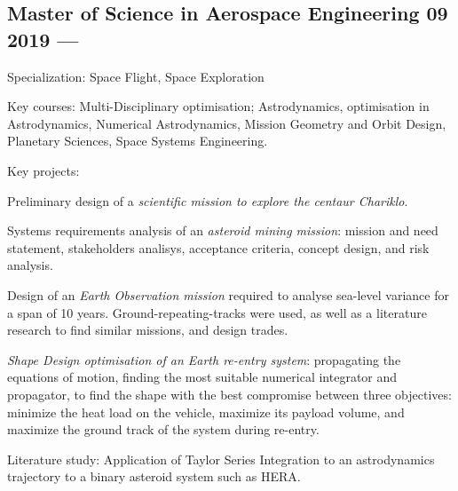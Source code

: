 


\subsection{{Master of Science in Aerospace Engineering} \hfill 09 2019 --- }
\begin{zitemize}
\item Specialization: Space Flight, Space Exploration
\item Key courses: Multi-Disciplinary optimisation; Astrodynamics, optimisation in Astrodynamics, Numerical Astrodynamics, Mission Geometry and Orbit Design, Planetary Sciences, Space Systems Engineering. 
\item Key projects: \begin{zitemize}
\item Preliminary design of a \textit{scientific mission to explore the centaur Chariklo}.
\item Systems requirements analysis of an \textit{asteroid mining mission}: mission and need statement, stakeholders analisys, acceptance criteria, concept design, and risk analysis.
\item Design of an \textit{Earth Observation mission} required to analyse sea-level variance for a span of 10 years. Ground-repeating-tracks were used, as well as a literature research to find similar missions, and design trades.
\item \textit{Shape Design optimisation of an Earth re-entry system}: propagating the equations of motion, finding the most suitable numerical integrator and propagator, to find the shape with the best compromise between three objectives: minimize the heat load on the vehicle, maximize its payload volume, and maximize the ground track of the system during re-entry.
\end{zitemize}
\item Literature study: Application of Taylor Series Integration to an astrodynamics trajectory to a binary asteroid system such as HERA. 

\end{zitemize}
